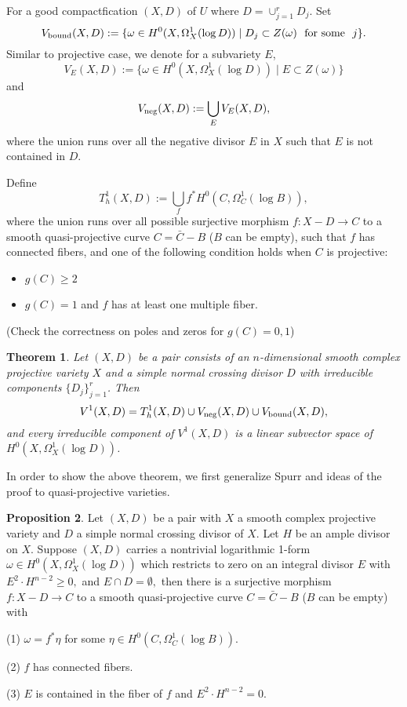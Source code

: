 \documentclass[a4paper,12pt,reqno]{amsart}
\newtheorem{theorem}{Theorem}[section]
\theoremstyle{plain}
\theoremstyle{definition}
\newtheorem{proposition}[theorem]{Proposition}
\theoremstyle{remark}
\begin{document}
For a good compactfication $(X,D)$ of $U$ where $D=\cup_{j=1}^r D_j$. Set $$V_{\textnormal{bound}}(X, D):= \{\omega\in H^0(X, \Omega_X^1(\log D)) \mid D_j \subset Z(\omega)\  \text{ for some }\  j \}.$$ Similar to projective case, we denote for a subvariety $E$, $$V_E(X, D):=\{\omega\in H^0(X, \Omega_X^1(\log D)) \mid  E \subset Z(\omega) \}$$ and 
 $$V_{\textnormal{neg}}(X, D):= \bigcup_E V_E(X, D),$$ where the union runs over all the negative divisor $E$ in $X$ such that $E$ is not contained in $D$. 
 
Define $$T_h^1(X, D):= \bigcup_f f^*H^0(C, \Omega_C^1(\log B)),$$
where the union runs over all possible surjective morphism $f: X-D\to C$ to a smooth quasi-projective curve $C=\bar{C}-B$ ($B$ can be empty), such that $f$ has  connected fibers, and one of the following condition holds when $C$ is projective:
\begin{itemize}
\item $g(C)\geq 2$
\item $g(C)=1$ and $f$ has at least one multiple fiber.
\end{itemize} 
{\color{red} (Check the correctness on poles and zeros for $g(C)=0,1$)} 
 
\begin{theorem} \label{thm:codim1quasiprojective} Let $(X, D)$ be a pair consists of an $n$-dimensional smooth complex projective variety $X$ and a simple normal crossing divisor $D$ with irreducible components $\{D_j\}_{j=1}^r$. Then 
$$
V^1(X,D)= T^1_h(X, D) \cup V_{\textnormal{neg}}(X, D) \cup V_{\textnormal{bound}}(X, D),
$$
and every irreducible component of $V^1(X,D)$ is a linear subvector space of $H^0(X, \Omega_X^1(\log D))$. 
\end{theorem}

In order to show the above theorem, we first generalize Spurr \cite[Theorem 2]{Sp88} and ideas of the proof to quasi-projective varieties. 

\begin{proposition} \label{Prop:Spurr-no-intersection}
Let $(X, D)$ be a pair with $X$ a smooth complex projective variety and $D$ a simple normal crossing divisor of $X$. Let $H$ be an ample divisor on $X$. Suppose $(X, D)$ carries a nontrivial logarithmic 1-form $\omega\in H^0(X, \Omega_X^1(\log D))$  which restricts to zero on an integral divisor $E$ with $E^2\cdot H^{n-2}\geq0,$ and $E\cap D=\emptyset,$ then there is a surjective morphism $f: X-D\to C$ to a smooth quasi-projective curve $C=\bar{C}-B$ ($B$ can be empty) with 

(1)  $\omega=f^*\eta$ for some $\eta\in H^0(C, \Omega_C^1(\log B))$.

(2) $f$ has connected fibers.

(3) $E$ is contained in the fiber of $f$ and $E^2\cdot H^{n-2}=0$.
\end{proposition}
\end{document}
